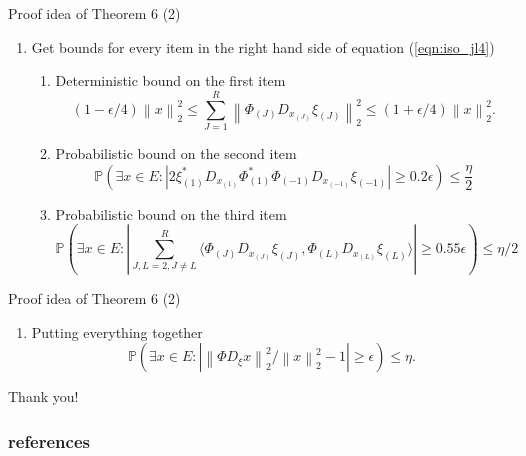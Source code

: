\documentclass{beamer}
\newcommand\norm[1]{\left\lVert#1\right\rVert}
\begin{document}
\begin{frame}{Proof idea of Theorem 6 (2)}
    \begin{enumerate}[2] 
        \item Get bounds for every item in the right hand side of equation (\ref{eqn:iso_jl4})
        \pause
        \begin{enumerate}
            \item  Deterministic bound on the first item
            \begin{equation}
    \label{eqn:iso_jl5}
    (1 - \epsilon/4) \norm{x}_2^2 \leq \sum_{J=1}^R \norm{\Phi_{(J)} D_{x_{(J)}} \xi_{(J)}}_2^2 \leq (1 + \epsilon/4) \norm{x}_2^2.
    \end{equation} \pause
     \item Probabilistic bound on the second item
        \begin{equation}
        \label{eqn:iso_jl7}
        \mathbb{P}(\exists x \in E: |2 \xi_{(1)}^* D_{x_{(1)}} \Phi_{(1)}^* \Phi_{(-1)} D_{x_{(-1)}} \xi_{(-1)}| \geq 0.2 \epsilon) \leq \frac{\eta}{2}
        \end{equation} \pause
         \item Probabilistic bound on the third item
       \begin{equation}
        \label{eqn:iso_jl8}
        \mathbb{P}(\exists x \in E: |\sum_{J,L = 2, J \not = L }^R \langle \Phi_{(J)} D_{x_{(J)}} \xi_{(J)}, \Phi_{(L)} D_{x_{(L)}} \xi_{(L)} \rangle| \geq 0.55 \epsilon) \leq \eta/2
        \end{equation}
        \end{enumerate} 
      
    \end{enumerate}
\end{frame}

\begin{frame}{Proof idea of Theorem 6 (2)}
\begin{enumerate} [3]
    \item Putting everything together
    \begin{equation}
        \mathbb{P}(\exists x \in E: |\norm{\Phi D_{\xi}x}_2^2/\norm{x}_2^2 - 1| \geq  \epsilon) \leq \eta.
    \end{equation}
\end{enumerate}
    
\end{frame}


\begin{frame}
\centering
    Thank you!
\end{frame}

\begin{frame}
\frametitle{references}
\small
\end{frame}

\end{document}
